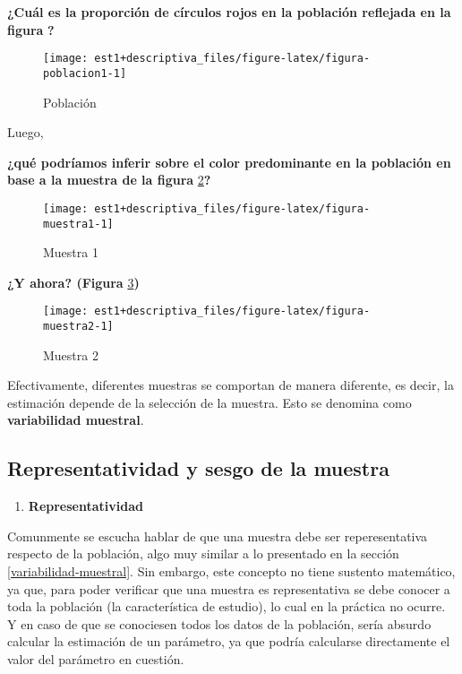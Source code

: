 \documentclass[
]{book}
\providecommand{\tightlist}{%
  \setlength{\itemsep}{0pt}\setlength{\parskip}{0pt}}
\begin{document}
\textbf{¿Cuál es la proporción de círculos rojos en la población reflejada en la figura} \textbf{?}

\begin{figure}

{\centering \texttt{[image: est1+descriptiva\_files/figure-latex/figura-poblacion1-1]} 

}

\caption{Población}\label{fig:figura-poblacion1}
\end{figure}

Luego,

\textbf{¿qué podríamos inferir sobre el color predominante en la población en base a la muestra de la figura} \ref{fig:figura-muestra1}\textbf{?}

\begin{figure}

{\centering \texttt{[image: est1+descriptiva\_files/figure-latex/figura-muestra1-1]} 

}

\caption{Muestra 1}\label{fig:figura-muestra1}
\end{figure}

\textbf{¿Y ahora? (Figura} \ref{fig:figura-muestra2}\textbf{)}

\begin{figure}

{\centering \texttt{[image: est1+descriptiva\_files/figure-latex/figura-muestra2-1]} 

}

\caption{Muestra 2}\label{fig:figura-muestra2}
\end{figure}

Efectivamente, diferentes muestras se comportan de manera diferente, es decir, la estimación depende de la selección de la muestra. Esto se denomina como \textbf{variabilidad muestral}.

\hypertarget{representatividad-y-sesgo-de-la-muestra}{%
\subsection{Representatividad y sesgo de la muestra}\label{representatividad-y-sesgo-de-la-muestra}}

\begin{enumerate}
\def\labelenumi{\arabic{enumi}.}
\tightlist
\item
  \textbf{Representatividad}
\end{enumerate}

Comunmente se escucha hablar de que una muestra debe ser reperesentativa respecto de la población, algo muy similar a lo presentado en la sección \ref{variabilidad-muestral}. Sin embargo, este concepto no tiene sustento matemático, ya que, para poder verificar que una muestra es representativa se debe conocer a toda la población (la característica de estudio), lo cual en la práctica no ocurre. Y en caso de que se conociesen todos los datos de la población, sería absurdo calcular la estimación de un parámetro, ya que podría calcularse directamente el valor del parámetro en cuestión.
\end{document}
